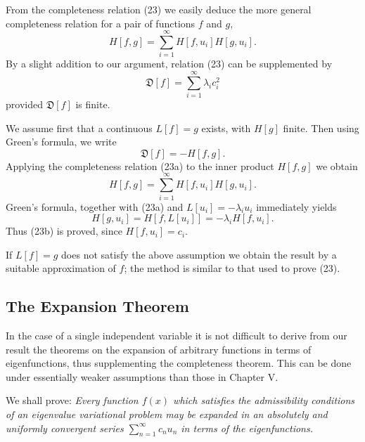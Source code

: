 From the completeness relation (23) we easily deduce the more general completeness relation for a pair of functions $f$ and $g$,
\begin{equation}\tag{23a}
H[f,g]=\sum_{i=1}^\infty H[f,u_i]H[g,u_i].
\end{equation}
By a slight addition to our argument, relation (23) can be supplemented by
\begin{equation}\tag{23b}
\mathfrak D[f]=\sum_{i=1}^\infty\lambda_i c_i^2
\end{equation}
provided $\mathfrak D[f]$ is finite.

We assume first that a continuous $L[f]=g$ exists, with $H[g]$ finite. Then using Green's formula, we write
\[
\mathfrak D[f]=-H[f,g].
\]
Applying the completeness relation (23a) to the inner product $H[f,g]$ we obtain
\[
H[f,g]=\sum_{i=1}^\infty H[f,u_i]H[g,u_i].
\]
Green's formula, together with (23a) and $L[u_i]=-\lambda_i u_i$ immediately yields
\[
H[g,u_i]=H[f,L[u_i]]=-\lambda_iH[f,u_i].
\]
Thus (23b) is proved, since $H[f,u_i]=c_i$.

If $L[f]=g$ does not satisfy the above assumption we obtain the result by a suitable approximation of $f$; the method is similar to that used to prove (23).

\subsection{The Expansion Theorem}
In the case of a single independent variable it is not difficult to derive from our result the theorems on the expansion of arbitrary functions in terms of eigenfunctions, thus supplementing the completeness theorem. This can be done under essentially weaker assumptions than those in Chapter V.

We shall prove: \emph{Every function $f(x)$ which satisfies the admissibility conditions of an eigenvalue variational problem may be expanded in an absolutely and uniformly convergent series $\sum_{n=1}^\infty c_nu_n$ in terms of the eigenfunctions.}

